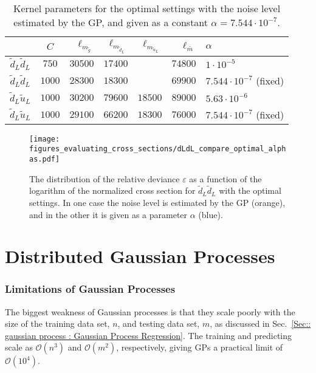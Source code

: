 \documentclass[twoside,english]{uiofysmaster}
\begin{document}
\begin{table}
\centering
\begin{tabular}{c|c|r|r|r|r|l}
& $C$ & $\ell_{m_{\tilde{g}}}$ & $\ell_{m_{\tilde{d}_L}}$ &$\ell_{m_{\tilde{u}_L}}$ & $\ell_{\bar{m}}$ & $\alpha$\\
\hline
$\tilde{d}_L \tilde{d}_L$ & $750$ & $30500$ & $17400$ && $74800$ & $1 \cdot 10^{-5}$\\
$\tilde{d}_L \tilde{d}_L$ & $1000$ & $28300$ & $18300$ && $69900$ & $7.544 \cdot 10^{-7}$ (fixed)\\
$\tilde{d}_L \tilde{u}_L$ & $1000$ & $30200$ & $79600$ & $18500$ & $89000$ & $5.63 \cdot 10^{-6}$\\
$\tilde{d}_L \tilde{u}_L$ & $1000$ & $29100$ & $66200$ & $18300$ & $76000$ & $7.544 \cdot 10^{-7}$ (fixed)\\
\end{tabular}
\caption{Kernel parameters for the optimal settings with the noise level estimated by the GP, and given as a constant $\alpha=7.544 \cdot 10^{-7}$.}
\label{Tab:: evaluating cross : optimal kernel parameters alpha}
\end{table}

\begin{figure}
\centering
\texttt{[image: figures\_evaluating\_cross\_sections/dLdL\_compare\_optimal\_alphas.pdf]}
\caption{The distribution of the relative deviance $\varepsilon$ as a function of the logarithm of the normalized cross section for $\tilde{d}_L \tilde{d}_L$ with the optimal settings. In one case the noise level is estimated by the GP (orange), and in the other it is given as a parameter $\alpha$ (blue).}
\label{Fig:: evaluating cross : errors distribution alpha vs no alpha optimal}
\end{figure}




\section{Distributed Gaussian Processes}\label{Sec:: gaussian process : Distributed Gaussian Processes}

\subsubsection{Limitations of Gaussian Processes}

The biggest weakness of Gaussian processes is that they scale poorly with the size of the training data set, $n$, and testing data set, $m$, as discussed in Sec.~\ref{Sec:: gaussian process : Gaussian Process Regression}. The training and predicting scale as $\mathcal{O}(n^3)$ and $\mathcal{O}(m^2)$, respectively, giving GPs a practical limit of $\mathcal{O}(10^4)$.
\end{document}
